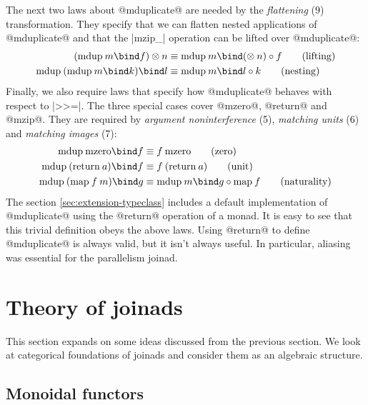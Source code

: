 \documentclass[preprint]{sigplanconf}
\begin{document}
The next two laws about @mduplicate@ are needed by the \textit{flattening}  (9) transformation. They
specify that we can flatten nested applications of @mduplicate@ and that the |mzip_| operation
can be lifted over @mduplicate@:
\begin{align*}
(\mduplicate \: m \bind f) \mzip n &\equiv \mduplicate \: m \bind (\mzip \: n) \circ f  \tag{lifting}\\
\mduplicate \: (\mduplicate \: m \bind k) \bind l &\equiv \mduplicate \: m \bind l \circ k   \tag{nesting}
\end{align*}
Finally, we also require laws that specify how @mduplicate@ behaves with respect to |>>=|. The three 
special cases cover @mzero@, @return@ and @mzip@. They are required by \textit{argument noninterference} 
(5), \textit{matching units} (6) and \textit{matching images} (7):
\begin{align*}
\mduplicate \: \mzero \bind f &\equiv f \: \mzero \tag{zero}\\
\mduplicate \: (\text{return} \: a) \bind f &\equiv f \: (\text{return} \: a) \tag{unit} \\
\mduplicate \: (\map \: f \: m) \bind g &\equiv \mduplicate \: m \bind g \circ \map \: f \tag{naturality}
\end{align*}
The section \ref{sec:extension-typeclass} includes a default implementation of @mduplicate@ using 
the @return@ operation of a monad. It is easy to see that this trivial definition obeys the above laws. 
Using @return@ to define @mduplicate@ is always valid, but it isn't 
always useful. In particular, aliasing was essential for the parallelism joinad.


\section{Theory of joinads}
\label{sec:theory}

This section expands on some ideas discussed from the previous section. We look at categorical 
foundations of joinads and consider them as an algebraic structure.


\subsection{Monoidal functors}
\label{sec:theory-monoidal}
\end{document}
